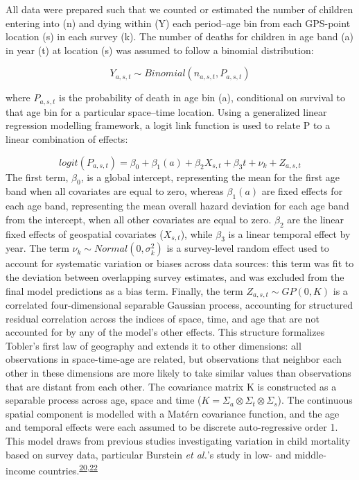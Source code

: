 \documentclass[
]{article}
\begin{document}
All data were prepared such that we counted or estimated the number of children entering into (n) and dying within (Y) each period--age bin from each GPS-point location (s) in each survey (k). The number of deaths for children in age band (a) in year (t) at location (s) was assumed to follow a binomial distribution:

\[Y_{a,s,t} \sim Binomial(n_{a,s,t}, P_{a,s,t})\]

where \(P_{a,s,t}\) is the probability of death in age bin (a), conditional on survival to that age bin for a particular space--time location. Using a generalized linear regression modelling framework, a logit link function is used to relate P to a linear combination of effects:

\[logit(P_{a,s,t})=\beta_0 + \beta_1(a) + \beta_2X_{s,t} + \beta_3t + \nu_{k} + Z_{a,s,t} \]
The first term, \(\beta_0\), is a global intercept, representing the mean for the first age band when all covariates are equal to zero, whereas \(\beta_1(a)\) are fixed effects for each age band, representing the mean overall hazard deviation for each age band from the intercept, when all other covariates are equal to zero. \(\beta_2\) are the linear fixed effects of geospatial covariates (\(X_{s,t}\)), while \(\beta_3\) is a linear temporal effect by year. The term \(\nu_k \sim Normal(0,\sigma^2_k)\) is a survey-level random effect used to account for systematic variation or biases across data sources: this term was fit to the deviation between overlapping survey estimates, and was excluded from the final model predictions as a bias term. Finally, the term \(Z_{a,s,t} \sim GP(0, K)\) is a correlated four-dimensional separable Gaussian process, accounting for structured residual correlation across the indices of space, time, and age that are not accounted for by any of the model's other effects. This structure formalizes Tobler's first law of geography and extends it to other dimensions: all observations in space-time-age are related, but observations that neighbor each other in these dimensions are more likely to take similar values than observations that are distant from each other. The covariance matrix K is constructed as a separable process across age, space and time (\(K = \Sigma_a \otimes \Sigma_t \otimes \Sigma_s\)). The continuous spatial component is modelled with a Matérn covariance function, and the age and temporal effects were each assumed to be discrete auto-regressive order 1. This model draws from previous studies investigating variation in child mortality based on survey data, particular Burstein \emph{et al.}'s study in low- and middle-income countries.\textsuperscript{\protect\hyperlink{ref-Burstein2019}{20},\protect\hyperlink{ref-Wakefield2019}{22}}
\end{document}
